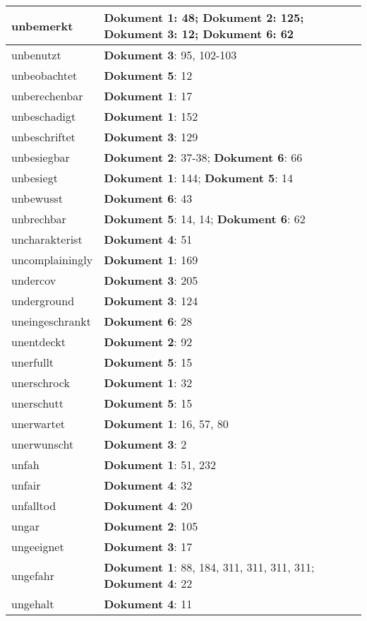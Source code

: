 \documentclass[a5paper]{article}
\begin{document}
\begin{longtable}[l]{|l|p{3in}|}
\hline
unbemerkt & \textbf{Dokument 1}: 48; \textbf{Dokument 2}: 125; \textbf{Dokument 3}: 12; \textbf{Dokument 6}: 62 \\
\hline
unbenutzt & \textbf{Dokument 3}: 95, 102-103 \\
\hline
unbeobachtet & \textbf{Dokument 5}: 12 \\
\hline
unberechenbar & \textbf{Dokument 1}: 17 \\
\hline
unbeschadigt & \textbf{Dokument 1}: 152 \\
\hline
unbeschriftet & \textbf{Dokument 3}: 129 \\
\hline
unbesiegbar & \textbf{Dokument 2}: 37-38; \textbf{Dokument 6}: 66 \\
\hline
unbesiegt & \textbf{Dokument 1}: 144; \textbf{Dokument 5}: 14 \\
\hline
unbewusst & \textbf{Dokument 6}: 43 \\
\hline
unbrechbar & \textbf{Dokument 5}: 14, 14; \textbf{Dokument 6}: 62 \\
\hline
uncharakterist & \textbf{Dokument 4}: 51 \\
\hline
uncomplainingly & \textbf{Dokument 1}: 169 \\
\hline
undercov & \textbf{Dokument 3}: 205 \\
\hline
underground & \textbf{Dokument 3}: 124 \\
\hline
uneingeschrankt & \textbf{Dokument 6}: 28 \\
\hline
unentdeckt & \textbf{Dokument 2}: 92 \\
\hline
unerfullt & \textbf{Dokument 5}: 15 \\
\hline
unerschrock & \textbf{Dokument 1}: 32 \\
\hline
unerschutt & \textbf{Dokument 5}: 15 \\
\hline
unerwartet & \textbf{Dokument 1}: 16, 57, 80 \\
\hline
unerwunscht & \textbf{Dokument 3}: 2 \\
\hline
unfah & \textbf{Dokument 1}: 51, 232 \\
\hline
unfair & \textbf{Dokument 4}: 32 \\
\hline
unfalltod & \textbf{Dokument 4}: 20 \\
\hline
ungar & \textbf{Dokument 2}: 105 \\
\hline
ungeeignet & \textbf{Dokument 3}: 17 \\
\hline
ungefahr & \textbf{Dokument 1}: 88, 184, 311, 311, 311, 311; \textbf{Dokument 4}: 22 \\
\hline
ungehalt & \textbf{Dokument 4}: 11 \\

\end{longtable}
\end{document}
